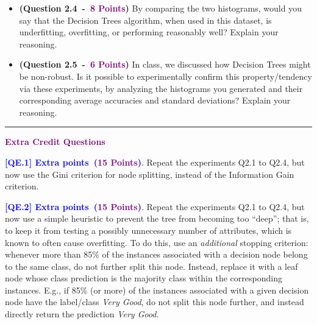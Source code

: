 \documentclass{article}
\newcommand{\HIGHLIGHT}[1]{\textcolor{blue}{\textbf{#1}}}
\newcommand{\POINTS}[1]{\textcolor{purple}{\textbf{{#1}}}}
\begin{document}
\begin{itemize}
    \item \textbf{(Question 2.4~-~\POINTS{8 Points})} By comparing the two histograms, would you say that the Decision Trees algorithm, when used in this dataset, is underfitting, overfitting, or performing reasonably well? Explain your reasoning.




    \item \textbf{(Question 2.5~-~\POINTS{6 Points})} In class, we discussed how Decision Trees might be non-robust. Is it possible to experimentally confirm this property/tendency via these experiments, by analyzing the histograms you generated and their corresponding average accuracies and standard deviations? Explain your reasoning.



    
\end{itemize}







\vspace{0.5in}
\noindent\rule{\textwidth}{1pt}
\vspace{0.08cm}
\noindent \textcolor{purple}{\textbf{\Large{Extra Credit Questions}}}
\vspace{1cm}



    \noindent \textbf{\HIGHLIGHT{[QE.1] Extra points~(\POINTS{15 Points})}}. Repeat the experiments Q2.1 to Q2.4, but now use the Gini criterion for node splitting, instead of the Information Gain criterion.




    \vspace{1cm}
    \noindent \textbf{\HIGHLIGHT{[QE.2] Extra points~(\POINTS{15 Points})}}. Repeat the experiments Q2.1 to Q2.4, but now use a simple heuristic to prevent the tree from becoming too ``deep''; that is, to keep it from testing a possibly unnecessary number of attributes, which is known to often cause overfitting. To do this, use an \textit{additional} stopping criterion: whenever more than 85\% of the instances associated with a decision node belong to the same class, do not further split this node. Instead, replace it with a leaf node whose class prediction is the majority class within the corresponding instances. E.g., if 85\% (or more) of the instances associated with a given decision node have the label/class \textit{Very Good}, do not split this node further, and instead directly return the prediction \textit{Very Good}.



    
\end{document}
